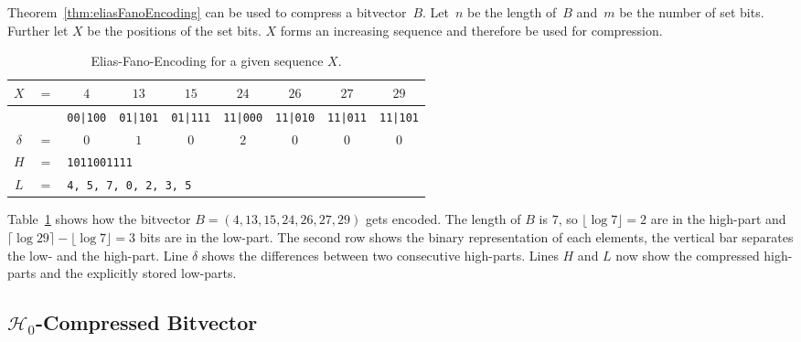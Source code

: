 Theorem~\ref{thm:eliasFanoEncoding} can be used to compress a bitvector~$B$. Let~$n$ be the length of~$B$ and~$m$ be the number of set bits. Further let $X$ be the positions of the set bits. $X$ forms an increasing sequence and therefore be used for compression.

\begin{Example}
  \begin{table}[htbp]
    \centering
    \begin{tabular}{ccccccccc}
      \toprule
      $X$ & $=$ & $4$ & $13$ & $15$ & $24$ & $26$ & $27$ & $29$ \\
      \midrule
      & &
      \texttt{00|100} &
      \texttt{01|101} &
      \texttt{01|111} &
      \texttt{11|000} &
      \texttt{11|010} &
      \texttt{11|011} &
      \texttt{11|101} \\

      $\delta$ & $=$ & $0$ & $1$ & $0$ & $2$ & $0$ & $0$ & $0$ \\
      $H$ & $=$ & \multicolumn{7}{l}{\texttt{1011001111}} \\
      $L$ & $=$ & \multicolumn{7}{l}{\texttt{4, 5, 7, 0, 2, 3, 5}} \\
      \bottomrule
    \end{tabular}
    \caption{Elias-Fano-Encoding for a given sequence $X$.}
    \label{tbl:eliasFanoExample}
  \end{table}
  Table~\ref{tbl:eliasFanoExample} shows how the bitvector $B=(4,13,15,24,26,27,29)$ gets encoded. The length of $B$ is $7$, so $\lfloor \log 7 \rfloor = 2$ are in the high-part and $\lceil \log 29 \rceil - \lfloor \log 7 \rfloor = 3$ bits are in the low-part. The second row shows the binary representation of each elements, the vertical bar separates the low- and the high-part. Line $\delta$ shows the differences between two consecutive high-parts. Lines $H$ and $L$ now show the compressed high-parts and the explicitly stored low-parts.
\end{Example}

\subsection{$\mathcal{H}_0$-Compressed Bitvector}
